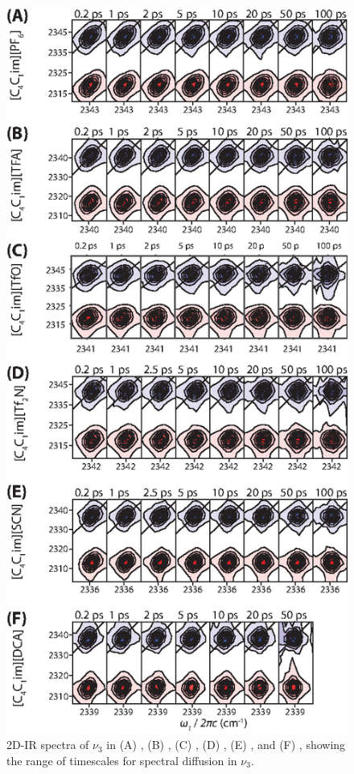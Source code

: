 \documentclass[%
  class = book,%
  crop = false,%
  float = true,%
  multi = true,%
  preview = false,%
]{standalone}
\begin{document}
{\begin{figure}[h]
  \centering
  \includegraphics[scale=1.0]{all_2d.eps}
  \caption[Experimental 2D-IR spectra of \texorpdfstring{}{carbon dioxide} in all \ce{[Im_{4,1}][X]}]{2D-IR spectra of  \(\nu_3\) in \ce{[Im_{4,1}+]} (A) \ce{[PF6]-}, (B) \ce{[TFA]-}, (C) \ce{[TfO]-}, (D) \ce{[Tf2N]-}, (E) \ce{[SCN]-}, and (F) \ce{[DCA]-}, showing the range of timescales for spectral diffusion in \(\nu_3\).}
  \label{paper_01:fig:SI_all_2D}
\end{figure}

}
\end{document}
